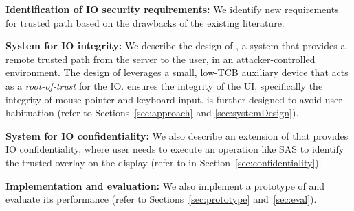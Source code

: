 \begin{mylist}
  \item \textbf{Identification of IO security requirements:} We identify new requirements for trusted path based on the drawbacks of the existing literature: 
  
   
  \item \textbf{System for IO integrity:} We describe the design of \name, a system that provides a remote trusted path from the server to the user, in an attacker-controlled environment. The design of \name leverages a small, low-TCB auxiliary device that acts as a \emph{root-of-trust} for the IO. \name ensures the integrity of the UI, specifically the integrity of mouse pointer and keyboard input. \name is further designed to avoid user habituation (refer to Sections~\ref{sec:approach} and \ref{sec:systemDesign}).
  
  \item \textbf{System for IO confidentiality:} We also describe an extension of \name that provides IO confidentiality, where user needs to execute an operation like SAS to identify the trusted overlay on the display (refer to in Section~\ref{sec:confidentiality}).
  
   
  \item \textbf{Implementation and evaluation:} We also implement a prototype of \name and evaluate its performance (refer to Sections~\ref{sec:prototype} and~\ref{sec:eval}).
\end{mylist}


